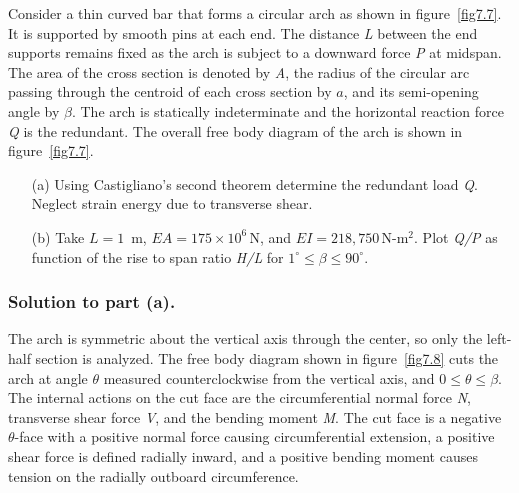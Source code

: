 \documentclass{AeroStructure-ERJohnson}
\begin{document}
\vspace*{-6pt}
\begin{example}\label{ex7.3}Consider a thin curved bar that forms a circular arch as shown in figure~\ref{fig7.7}. It is supported by smooth pins at each end. The distance \textit{L} between the end supports remains fixed as the arch is subject to a downward force \textit{P} at midspan. The area of the cross section is denoted by \textit{A}, the radius of the circular arc passing through the centroid of each cross section by $a$, and its semi-opening angle by $\beta$. The arch is statically indeterminate and the horizontal reaction force \textit{Q} is the redundant. The overall free body diagram of the arch is shown in figure~\ref{fig7.7}.
\begin{enumerate}[(a)]
\item[(a)] Using Castigliano's second theorem determine the redundant load \textit{Q}. Neglect strain energy due to transverse shear.

\item[(b)] Take $L = 1$~m, $E A=175\times 10^{6}\,\mathrm{N}$, and $E I=218,750\,\mathrm{N}$-$\mathrm{m}^{2}$. Plot \textit{Q/P} as function of the rise to span ratio \textit{H/L} for $1^{\circ} \leq \beta \leq 90^{\circ}$.
\end{enumerate}


{\def\thefigure{7.7}
}


\subsubsection{Solution to part (a).} The arch is symmetric about the vertical axis through the center, so only the left-half section is analyzed. The free body diagram shown in figure~\ref{fig7.8} cuts the arch at angle $\theta$ measured counterclockwise from the vertical axis, and $0 \leq \theta \leq \beta$. The internal actions on the cut face are the circumferential normal force \textit{N}, transverse shear force \textit{V}, and the bending moment \textit{M}. The cut face is a negative $\theta$-face with a positive normal force causing circumferential extension, a positive shear force is defined radially inward, and a positive bending moment causes tension on the radially outboard circumference.


\end{example}
\end{document}
